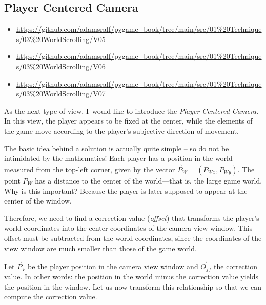 \subsection{Player Centered Camera}\label{secPlayerCenteredCamera}
\begin{diskbox}
	\begin{itemize}
		\item \url{https://github.com/adamsralf/pygame_book/tree/main/src/01%20Techniques/03%20WorldScrolling/V05}
		\item \url{https://github.com/adamsralf/pygame_book/tree/main/src/01%20Techniques/03%20WorldScrolling/V06}
		\item \url{https://github.com/adamsralf/pygame_book/tree/main/src/01%20Techniques/03%20WorldScrolling/V07}
	\end{itemize}
\end{diskbox}

As the next type of view, I~would like to introduce the \emph{Player-Centered Camera}.  
In this view, the player appears to be fixed at the center, while the elements of the game move according to the player’s subjective direction of movement.

The basic idea behind a solution is actually quite simple -- so do not be intimidated by the mathematics! Each player has a position in the world measured from the top-left corner, given by the vector $\vec{P}_W = (P_{Wx}, P_{Wy})$. The point $P_W$ has a distance to the center of the world—that is, the large game world. Why is this important? Because the player is later supposed to appear at the center of the window.

Therefore, we need to find a correction value (\emph{offset}) that transforms the player’s world coordinates into the center coordinates of the camera view window. This offset must be subtracted from the world coordinates, since the coordinates of the view window are much smaller than those of the game world.  

Let $\vec{P}_V$ be the player position in the camera view window and $\vec{O}_{ff}$ the correction value. In other words: the position in the world minus the correction value yields the position in the window. Let us now transform this relationship so that we can compute the correction value.

